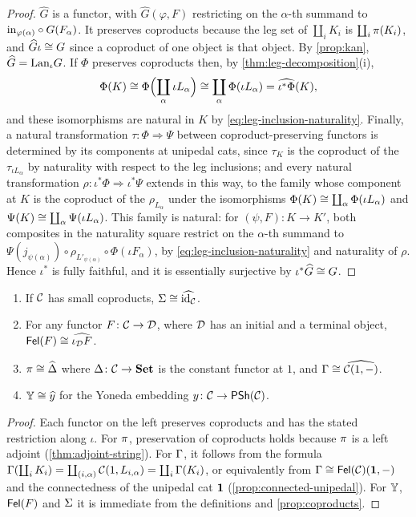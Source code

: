 \begin{proof}
$\widehat G$ is a functor, with $\widehat G(\varphi,F)$ restricting on the
$\alpha$-th summand to $\mathrm{in}_{\varphi(\alpha)}\circ G(F_\alpha)$. It preserves
coproducts because the leg set of $\coprod_iK_i$ is $\coprod_i\pi(K_i)$, and
$\widehat G\iota\cong G$ since a coproduct of one object is that object. By
\cref{prop:kan}, $\widehat G=\mathrm{Lan}_\iota G$. If $\Phi$ preserves coproducts then,
by \cref{thm:leg-decomposition}(i),
\[
\Phi(K)\cong\Phi\Bigl(\coprod_\alpha\iota L_\alpha\Bigr)\cong\coprod_\alpha\Phi(\iota L_\alpha)=\widehat{\iota^*\Phi}(K),
\]
and these isomorphisms are natural in $K$ by \eqref{eq:leg-inclusion-naturality}.
Finally, a natural transformation $\tau\colon\Phi\Rightarrow\Psi$ between
coproduct-preserving functors is determined by its components at unipedal cats,
since $\tau_K$ is the coproduct of the $\tau_{\iota L_\alpha}$ by naturality with
respect to the leg inclusions; and every natural transformation
$\rho\colon\iota^*\Phi\Rightarrow\iota^*\Psi$ extends in this way, to the family
whose component at $K$ is the coproduct of the $\rho_{L_\alpha}$ under the
isomorphisms $\Phi(K)\cong\coprod_\alpha\Phi(\iota L_\alpha)$ and
$\Psi(K)\cong\coprod_\alpha\Psi(\iota L_\alpha)$. This family is natural: for
$(\psi,F)\colon K\to K'$, both composites in the naturality square restrict on
the $\alpha$-th summand to $\Psi(j_{\psi(\alpha)})\circ\rho_{L'_{\psi(\alpha)}}\circ\Phi(\iota F_\alpha)$,
by \eqref{eq:leg-inclusion-naturality} and naturality of $\rho$. Hence $\iota^*$ is fully
faithful, and it is essentially surjective by $\iota^*\widehat G\cong G$.
\end{proof}

\begin{corollary}\label{cor:universal-examples}
\begin{enumerate}
\item If $\mathcal{C}$ has small coproducts, $\Sigma\cong\widehat{\mathrm{id}_{\mathcal{C}}}$.
\item For any functor $F\colon\mathcal{C}\to\mathcal{D}$, where $\mathcal{D}$ has an initial and a
  terminal object, $\mathsf{Fel}(F)\cong\widehat{\iota_{\mathcal{D}} F}$.
\item $\pi\cong\widehat{\Delta}$ where $\Delta\colon\mathcal{C}\to\mathbf{Set}$ is the constant
  functor at $1$, and $\Gamma\cong\widehat{\mathcal{C}(1,-)}$.
\item $\mathbb{Y}\cong\widehat{y}$ for the Yoneda embedding $y\colon\mathcal{C}\to\mathsf{PSh}(\mathcal{C})$.
\end{enumerate}
\end{corollary}

\begin{proof}
Each functor on the left preserves coproducts and has the stated restriction
along $\iota$. For $\pi$, preservation of coproducts holds because $\pi$ is
a left adjoint (\cref{thm:adjoint-string}). For $\Gamma$, it follows from the
formula $\Gamma(\coprod_iK_i)=\coprod_{(i,\alpha)}\mathcal{C}(1,L_{i,\alpha})=\coprod_i\Gamma(K_i)$,
or equivalently from $\Gamma\cong\mathsf{Fel}(\mathcal{C})(\mathbf{1},-)$ and the connectedness
of the unipedal cat $\mathbf{1}$ (\cref{prop:connected-unipedal}). For $\mathbb{Y}$,
$\mathsf{Fel}(F)$ and $\Sigma$ it is immediate from the definitions and
\cref{prop:coproducts}.
\end{proof}

